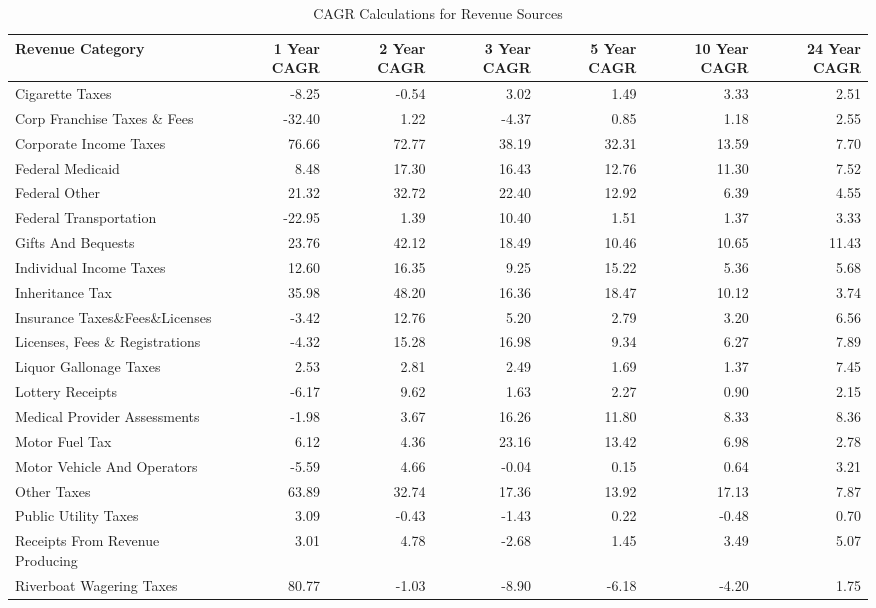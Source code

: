 \documentclass[
  letterpaper,
  DIV=11,
  numbers=noendperiod]{scrreport}
\begin{document}
\begin{table}

\caption{CAGR Calculations for Revenue Sources}
\centering
\begin{tabular}[t]{l|r|r|r|r|r|r}
\hline
Revenue Category & 1 Year CAGR & 2 Year CAGR & 3 Year CAGR & 5 Year CAGR & 10 Year CAGR & 24 Year CAGR\\
\hline
Cigarette Taxes & -8.25 & -0.54 & 3.02 & 1.49 & 3.33 & 2.51\\
\hline
Corp Franchise Taxes \& Fees & -32.40 & 1.22 & -4.37 & 0.85 & 1.18 & 2.55\\
\hline
Corporate Income Taxes & 76.66 & 72.77 & 38.19 & 32.31 & 13.59 & 7.70\\
\hline
Federal Medicaid & 8.48 & 17.30 & 16.43 & 12.76 & 11.30 & 7.52\\
\hline
Federal Other & 21.32 & 32.72 & 22.40 & 12.92 & 6.39 & 4.55\\
\hline
Federal Transportation & -22.95 & 1.39 & 10.40 & 1.51 & 1.37 & 3.33\\
\hline
Gifts And Bequests & 23.76 & 42.12 & 18.49 & 10.46 & 10.65 & 11.43\\
\hline
Individual Income Taxes & 12.60 & 16.35 & 9.25 & 15.22 & 5.36 & 5.68\\
\hline
Inheritance Tax & 35.98 & 48.20 & 16.36 & 18.47 & 10.12 & 3.74\\
\hline
Insurance Taxes\&Fees\&Licenses & -3.42 & 12.76 & 5.20 & 2.79 & 3.20 & 6.56\\
\hline
Licenses, Fees \& Registrations & -4.32 & 15.28 & 16.98 & 9.34 & 6.27 & 7.89\\
\hline
Liquor Gallonage Taxes & 2.53 & 2.81 & 2.49 & 1.69 & 1.37 & 7.45\\
\hline
Lottery Receipts & -6.17 & 9.62 & 1.63 & 2.27 & 0.90 & 2.15\\
\hline
Medical Provider Assessments & -1.98 & 3.67 & 16.26 & 11.80 & 8.33 & 8.36\\
\hline
Motor Fuel Tax & 6.12 & 4.36 & 23.16 & 13.42 & 6.98 & 2.78\\
\hline
Motor Vehicle And Operators & -5.59 & 4.66 & -0.04 & 0.15 & 0.64 & 3.21\\
\hline
Other Taxes & 63.89 & 32.74 & 17.36 & 13.92 & 17.13 & 7.87\\
\hline
Public Utility Taxes & 3.09 & -0.43 & -1.43 & 0.22 & -0.48 & 0.70\\
\hline
Receipts From Revenue Producing & 3.01 & 4.78 & -2.68 & 1.45 & 3.49 & 5.07\\
\hline
Riverboat Wagering Taxes & 80.77 & -1.03 & -8.90 & -6.18 & -4.20 & 1.75\\

\end{tabular}
\end{table}
\end{document}
